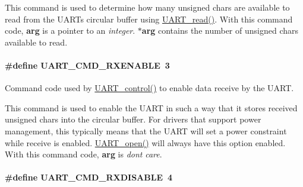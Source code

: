 This command is used to determine how many {\ttfamily unsigned} {\ttfamily chars} are available to read from the U\+A\+R\+T\textquotesingle{}s circular buffer using \hyperlink{_u_a_r_t_8h_a023152d57539cad94bdd813956013e73}{U\+A\+R\+T\+\_\+read()}. With this command code, {\bfseries arg} is a pointer to an {\itshape integer}. {\bfseries $\ast$arg} contains the number of {\ttfamily unsigned} {\ttfamily chars} available to read. 
\paragraph[{U\+A\+R\+T\+\_\+\+C\+M\+D\+\_\+\+R\+X\+E\+N\+A\+B\+L\+E}]{\setlength{\rightskip}{0pt plus 5cm}\#define U\+A\+R\+T\+\_\+\+C\+M\+D\+\_\+\+R\+X\+E\+N\+A\+B\+L\+E~3}\label{group___u_a_r_t___c_m_d_gad67d01fa376f25bb28141d819647e8d3}


Command code used by \hyperlink{_u_a_r_t_8h_a9de3c26cfe4ce6b7f350a6ea6e16801d}{U\+A\+R\+T\+\_\+control()} to enable data receive by the U\+A\+R\+T. 

This command is used to enable the U\+A\+R\+T in such a way that it stores received unsigned chars into the circular buffer. For drivers that support power management, this typically means that the U\+A\+R\+T will set a power constraint while receive is enabled. \hyperlink{_u_a_r_t_8h_a0442ea1ec23901168da31726bb3254c1}{U\+A\+R\+T\+\_\+open()} will always have this option enabled. With this command code, {\bfseries arg} is {\itshape don\textquotesingle{}t} {\itshape care}. 
\paragraph[{U\+A\+R\+T\+\_\+\+C\+M\+D\+\_\+\+R\+X\+D\+I\+S\+A\+B\+L\+E}]{\setlength{\rightskip}{0pt plus 5cm}\#define U\+A\+R\+T\+\_\+\+C\+M\+D\+\_\+\+R\+X\+D\+I\+S\+A\+B\+L\+E~4}\label{group___u_a_r_t___c_m_d_gac0b19ce2fa9f43d3fe255bcdbd3cda7b}



